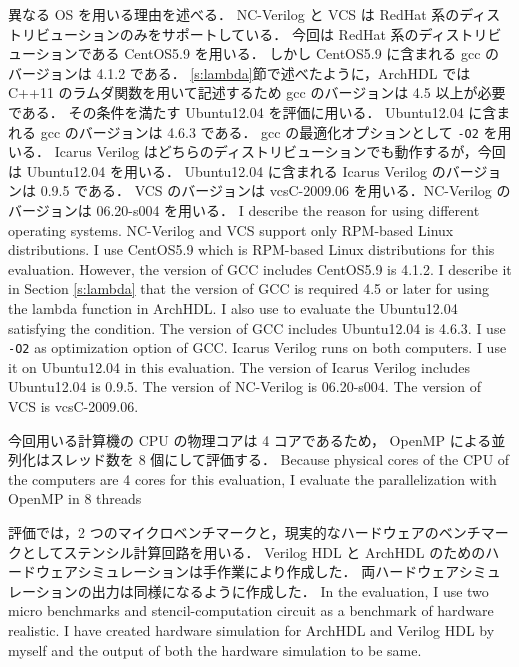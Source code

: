 異なる OS を用いる理由を述べる．
NC-Verilog と VCS は RedHat 系のディストリビューションのみをサポートしている．
今回は RedHat 系のディストリビューションである CentOS5.9 を用いる．
しかし CentOS5.9 に含まれる gcc のバージョンは 4.1.2 である．
\ref{s:lambda}節で述べたように，ArchHDL では C++11 のラムダ関数を用いて記述するため gcc のバージョンは 4.5 以上が必要である．
その条件を満たす Ubuntu12.04 を評価に用いる．
Ubuntu12.04 に含まれる gcc のバージョンは 4.6.3 である．
gcc の最適化オプションとして \verb/-O2/ を用いる．
Icarus Verilog はどちらのディストリビューションでも動作するが，今回は Ubuntu12.04 を用いる．
Ubuntu12.04 に含まれる Icarus Verilog のバージョンは 0.9.5 である．
VCS のバージョンは vcsC-2009.06 を用いる．NC-Verilog のバージョンは 06.20-s004 を用いる．
\fi
I describe the reason for using different operating systems.
NC-Verilog and VCS support only RPM-based Linux distributions.
I use CentOS5.9 which is RPM-based Linux distributions for this evaluation.
However, the version of GCC includes CentOS5.9 is 4.1.2.
I describe it in Section \ref{s:lambda} that the version of GCC is required 4.5 or later  for using the lambda function in ArchHDL.
I also use to evaluate the Ubuntu12.04 satisfying the condition.
The version of GCC includes Ubuntu12.04 is 4.6.3.
I use \verb/-O2/ as optimization option of GCC.
Icarus Verilog runs on both computers.
I use it on Ubuntu12.04 in this evaluation.
The version of Icarus Verilog includes Ubuntu12.04 is 0.9.5.
The version of NC-Verilog is 06.20-s004.
The version of VCS is vcsC-2009.06.

今回用いる計算機の CPU の物理コアは 4 コアであるため， OpenMP による並列化はスレッド数を 8 個にして評価する．
\fi
Because physical cores of the CPU of the computers are 4 cores for this evaluation,
I evaluate the parallelization with OpenMP in 8 threads

評価では，2 つのマイクロベンチマークと，現実的なハードウェアのベンチマークとしてステンシル計算回路\cite{koba:stencil}を用いる．
Verilog HDL と ArchHDL のためのハードウェアシミュレーションは手作業により作成した．
両ハードウェアシミュレーションの出力は同様になるように作成した．
\fi
In the evaluation, I use two micro benchmarks
and stencil-computation circuit as a benchmark of hardware realistic.
I have created hardware simulation for ArchHDL and Verilog HDL by myself
and the output of both the hardware simulation to be same.

